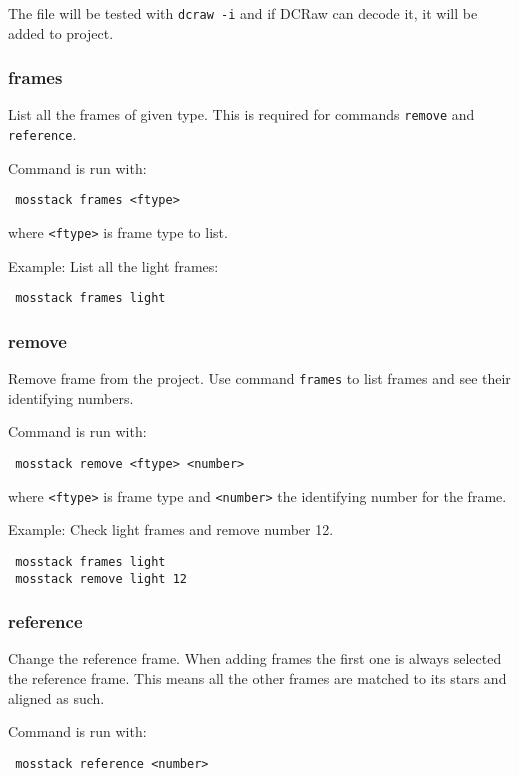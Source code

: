 \documentclass[twoside,a4paper]{refart}
\begin{document}
The file will be tested with \texttt{dcraw -i} and if DCRaw can decode it, it will be added to project.

\subsubsection{frames}
List all the frames of given type. This is required for commands \texttt{remove} and \texttt{reference}.

Command is run with:
\begin{verbatim}
 mosstack frames <ftype>
\end{verbatim}

where \texttt{<ftype>} is frame type to list.

Example: List all the light frames:

\begin{verbatim}
 mosstack frames light
\end{verbatim}


\subsubsection{remove}
Remove frame from the project. Use command \texttt{frames} to list frames and see their identifying numbers.

Command is run with:
\begin{verbatim}
 mosstack remove <ftype> <number>
\end{verbatim}

where \texttt{<ftype>} is frame type and \texttt{<number>} the identifying number for the frame.

Example: Check light frames and remove number 12.
\begin{verbatim}
 mosstack frames light
 mosstack remove light 12
\end{verbatim}


\subsubsection{reference}
Change the reference frame. When adding frames the first one is always selected the reference frame.
This means all the other frames are matched to its stars and aligned as such.

Command is run with:
\begin{verbatim}
 mosstack reference <number>
\end{verbatim}
\end{document}
